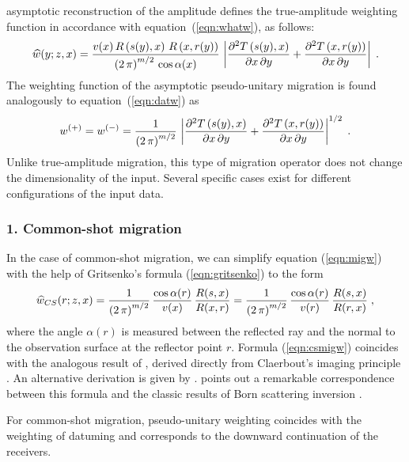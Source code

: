 asymptotic reconstruction of the amplitude defines the true-amplitude
weighting function in accordance with equation~(\ref{eqn:whatw}), as
follows:
\begin{equation}
\widehat{w}(y;z,x)  =  
{{v(x)\,R\left(s(y),x\right)\,R\left(x,r(y)\right)}   
\over {\left(2\,\pi\right)^{m/2}\,\cos{\alpha(x)}}}\,
\left|{{\partial^2 T\left(s(y),x\right)} 
\over {\partial x\,\partial y}} +     
      {{\partial^2 T\left(x,r(y)\right)} 
\over {\partial x\,\partial y}}\right|\;.
\label{eqn:migw}
\end{equation}
The weighting function of the asymptotic pseudo-unitary migration is
found analogously to equation~(\ref{eqn:datw}) as
\begin{equation}
w^{(+)}  =  w^{(-)}  =  {1\over{\left(2\,\pi\right)^{m/2}}} \,
\left|{{\partial^2
T\left(s(y),x\right)}
\over {\partial x\,\partial y}} +     
      {{\partial^2 T\left(x,r(y)\right)} 
\over {\partial x\,\partial y}}\right|^{1/2}\;.
\label{eqn:pumigw}
\end{equation}
Unlike true-amplitude migration, this type of migration operator
does not change the dimensionality of the input. Several specific cases exist
for different configurations of the input data.

\subsubsection{1. Common-shot migration}
In the case of common-shot migration, we can simplify equation (\ref{eqn:migw})
with the help of Gritsenko's formula (\ref{eqn:gritsenko}) to the form
\begin{equation}
\widehat{w}_{CS}(r;z,x)  =  {1\over{\left(2\,\pi\right)^{m/2}}} \,
{{\cos{\alpha(r)}} \over {v(x)}}\,
{{R(s,x)} \over {R(x,r)}} = {1\over{\left(2\,\pi\right)^{m/2}}} \,
{{\cos{\alpha(r)}} \over {v(r)}}\,
{{R(s,x)} \over {R(r,x)}} \;,
\label{eqn:csmigw}
\end{equation}
where the angle $\alpha(r)$ is measured between the reflected ray and
the normal to the observation surface at the reflector point $r$.
Formula (\ref{eqn:csmigw}) coincides with the analogous result of
\cite{GEO53-12-15401546}, derived directly from Claerbout's imaging
principle \cite[]{GEO35-03-04070418}. An alternative derivation is
given by \cite{goldin87}.  \cite{GEO56-08-11641169} points out a
remarkable correspondence between this formula and the classic results
of Born scattering inversion \cite[]{GEO52-07-09310942}.

For common-shot migration, pseudo-unitary weighting coincides with the
weighting of datuming and corresponds to the downward continuation of the
receivers.

